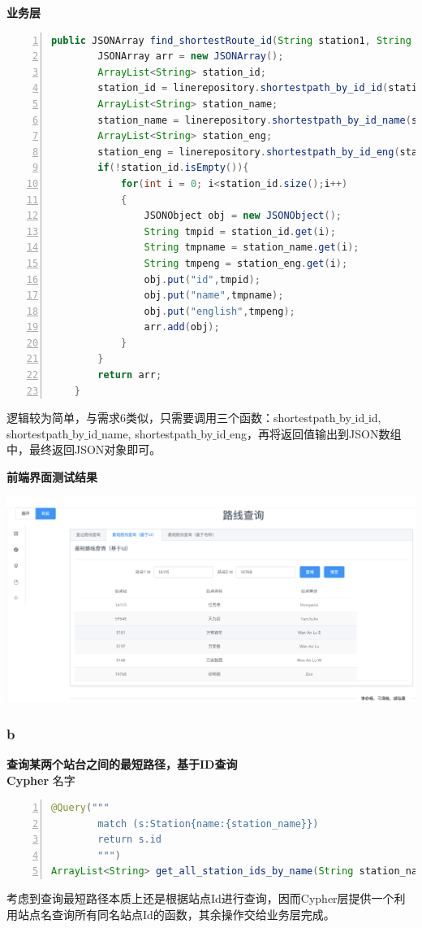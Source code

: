 \documentclass[11pt,a4paper]{article}
\begin{document}
\textbf{业务层} \\
\begin{lstlisting}[numbers = left, 
showstringspaces=false,
showspaces = false,
breaklines = true, 
language=Java]
    public JSONArray find_shortestRoute_id(String station1, String station2){
        JSONArray arr = new JSONArray();
        ArrayList<String> station_id;
        station_id = linerepository.shortestpath_by_id_id(station1, station2);
        ArrayList<String> station_name;
        station_name = linerepository.shortestpath_by_id_name(station1, station2);
        ArrayList<String> station_eng;
        station_eng = linerepository.shortestpath_by_id_eng(station1, station2);
        if(!station_id.isEmpty()){
            for(int i = 0; i<station_id.size();i++)
            {
                JSONObject obj = new JSONObject();
                String tmpid = station_id.get(i);
                String tmpname = station_name.get(i);
                String tmpeng = station_eng.get(i);
                obj.put("id",tmpid);
                obj.put("name",tmpname);
                obj.put("english",tmpeng);
                arr.add(obj);
            }
        }
        return arr;
    }
\end{lstlisting} 
逻辑较为简单，与需求6类似，只需要调用三个函数：shortestpath$\_$by$\_$id$\_$id, shortestpath$\_$by$\_$id$\_$name, shortestpath$\_$by$\_$id$\_$eng，再将返回值输出到JSON数组中，最终返回JSON对象即可。

\textbf{前端界面测试结果} \\
\begin{center}
\centering
\includegraphics[scale=0.3]{./assets/demand5_1.png} 
\end{center}

\subsubsection{b}
\textbf{查询某两个站台之间的最短路径，基于ID查询} \\
\textbf{Cypher} 名字
\begin{lstlisting}[numbers = left, 
showstringspaces=false,
showspaces = false,
breaklines = true, 
language=Java]
@Query("""
        match (s:Station{name:{station_name}})
        return s.id
    	""")
ArrayList<String> get_all_station_ids_by_name(String station_name);
\end{lstlisting} 
考虑到查询最短路径本质上还是根据站点Id进行查询，因而Cypher层提供一个利用站点名查询所有同名站点Id的函数，其余操作交给业务层完成。
\end{document}
